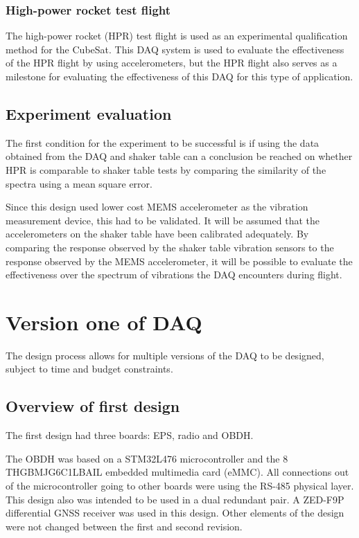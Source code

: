 \documentclass[]{report}
\begin{document}
\subsubsection{High-power rocket test flight}

The high-power rocket (HPR) test flight is used as an experimental qualification method for the CubeSat. This DAQ system is used to evaluate the effectiveness of the HPR flight by using accelerometers, but the HPR flight also serves as a milestone for evaluating the effectiveness of this DAQ for this type of application.

\subsection{Experiment evaluation}

The first condition for the experiment to be successful is if using the data obtained from the DAQ and shaker table can a conclusion be reached on whether HPR is comparable to shaker table tests by comparing the similarity of the spectra using a mean square error.

Since this design used lower cost MEMS accelerometer as the vibration measurement device, this had to be validated. It will be assumed that the accelerometers on the shaker table have been calibrated adequately. By comparing the response observed by the shaker table vibration sensors to the response observed by the MEMS accelerometer, it will be possible to evaluate the effectiveness over the spectrum of vibrations the DAQ encounters during flight.

\section{Version one of DAQ}

The design process allows for multiple versions of the DAQ to be designed, subject to time and budget constraints.

\subsection{Overview of first design}

The first design had three boards: EPS, radio and OBDH.

The OBDH was based on a STM32L476 microcontroller and the \SI{8}{\giga\bit} THGBMJG6C1LBAIL embedded multimedia card (eMMC). All connections out of the microcontroller going to other boards were using the RS-485 physical layer. This design also was intended to be used in a dual redundant pair. A ZED-F9P differential GNSS receiver was used in this design. Other elements of the design were not changed between the first and second revision.
\end{document}
